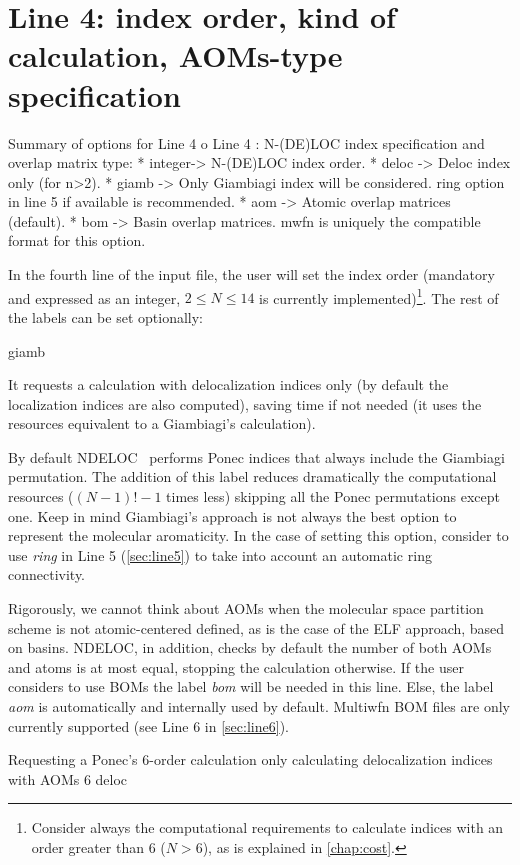 \documentclass[a4paper,11pt,openany]{memoir}
\newcommand\programa{\textsc{NDELOC}}
\begin{document}
\section{Line 4: index order, kind of calculation, \acp{AOM}-type specification}\label{sec:line4}
\begin{recuadro}{Summary of options for Line 4}
o Line 4 :  N-(DE)LOC index specification and overlap matrix type:
 *  integer-> N-(DE)LOC index order.
 *  deloc  -> Deloc index only (for n>2).
 *  giamb  -> Only Giambiagi index will be considered.
              ring option in line 5 if available is recommended.
 *  aom    -> Atomic overlap matrices (default).
 *  bom    -> Basin  overlap matrices. mwfn is uniquely the compatible format
              for this option.
\end{recuadro}
In the fourth line of the input file, the user will set the index order (mandatory and expressed as an integer, $2\le N\le 14$ is currently implemented)\footnote{Consider always the computational requirements to calculate indices with an order greater than 6 ($N>6$), as is explained in \autoref{chap:cost}.}. The rest of the labels can be set optionally:
\begin{labeling}{giamb}
	\item[deloc] It requests a calculation with delocalization indices only (by default the localization indices are also computed), saving time if not needed (it uses the resources equivalent to a Giambiagi's calculation).
	\item[giamb] By default \programa~ performs Ponec indices that always include the Giambiagi permutation. The addition of this label reduces dramatically the computational resources ($(N-1)!-1$ times less) skipping all the Ponec permutations except one. Keep in mind Giambiagi's approach is not always the best option to represent the molecular aromaticity. In the case of setting this option, consider to use \emph{ring} in Line 5 (\autoref{sec:line5}) to take into account an automatic ring connectivity.
	\item[\ac{AOM}] Rigorously, we cannot think about \acfp{AOM} when the molecular space partition scheme is not atomic-centered defined, as is the case of the \ac{ELF} approach, based on basins. \programa, in addition, checks by default the number of both \acp{AOM} and atoms is at most equal, stopping the calculation otherwise. If the user considers to use \acp{BOM} the label \emph{bom} will be needed in this line. Else, the label \emph{aom} is automatically and internally used by default. Multiwfn \ac{BOM} files are only currently supported (see Line 6 in \autoref{sec:line6}).
\end{labeling}
\begin{myexample}{Requesting a Ponec's 6-order calculation only calculating delocalization indices with \acp{AOM}}
	6 deloc
\end{myexample}
\end{document}
